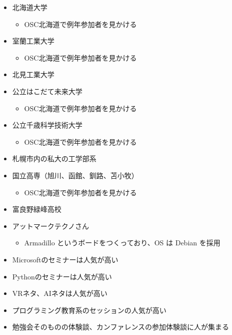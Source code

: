 \documentclass[mingoth,a4paper]{jsarticle}
\begin{document}

\begin{itemize}
\item 北海道大学
  \begin{itemize}
  \item OSC北海道で例年参加者を見かける
  \end{itemize}
\item 室蘭工業大学
  \begin{itemize}
  \item OSC北海道で例年参加者を見かける
  \end{itemize}
\item 北見工業大学
\item 公立はこだて未来大学
  \begin{itemize}
  \item OSC北海道で例年参加者を見かける
  \end{itemize}
\item 公立千歳科学技術大学
  \begin{itemize}
  \item OSC北海道で例年参加者を見かける
  \end{itemize}
\item 札幌市内の私大の工学部系
\item 国立高専（旭川、函館、釧路、苫小牧）
  \begin{itemize}
  \item OSC北海道で例年参加者を見かける
  \end{itemize}
\item 富良野緑峰高校
\end{itemize}



\begin{itemize}
\item アットマークテクノさん
  \begin{itemize}
  \item Armadillo というボードをつくっており、OS は Debian を採用
  \end{itemize}
\end{itemize}



\begin{itemize}
\item Microsoftのセミナーは人気が高い
\item Pythonのセミナーは人気が高い
\item VRネタ、AIネタは人気が高い
\item プログラミング教育系のセッションの人気が高い
\item 勉強会そのものの体験談、カンファレンスの参加体験談に人が集まる
\end{itemize}
\end{document}

